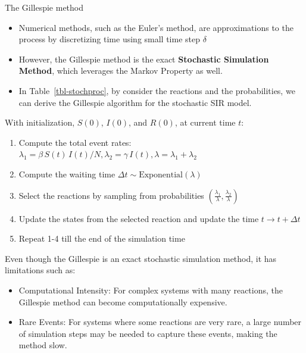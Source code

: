 \documentclass[
  ignorenonframetext,
  aspectratio=169,
  t]{beamer}
\theoremstyle{definition}
\begin{document}
\begin{frame}[allowframebreaks]{The Gillespie method}
\label{the-gillespie-method}
\begin{itemize}
\item
  Numerical methods, such as the Euler's method, are approximations to
  the process by discretizing time using small time step \(\delta\)
\item
  However, the Gillespie method is the exact \textbf{Stochastic
  Simulation Method}, which leverages the Markov Property as well.
\item
  In Table~\ref{tbl-stochproc}, by consider the reactions and the
  probabilities, we can derive the Gillespie algorithm for the
  stochastic SIR model.
\end{itemize}

\framebreak

With initialization, \(S(0)\), \(I(0)\), and \(R(0)\), at current time
\(t\):

\begin{enumerate}
\item
  Compute the total event rates:
  \(\lambda_1 = \beta\,S(t)\,I(t)/N, \lambda_2 = \gamma\,I(t), \lambda = \lambda_1 + \lambda_2\)
\item
  Compute the waiting time
  \(\Delta t \sim \mathrm{Exponential}(\lambda)\)
\item
  Select the reactions by sampling from probabilities
  \(\left(\frac{\lambda_1}{\lambda}, \frac{\lambda_2}{\lambda}\right)\)
\item
  Update the states from the selected reaction and update the time
  \(t\to t+\Delta t\)
\item
  Repeat 1-4 till the end of the simulation time
\end{enumerate}

\vfill

Even though the Gillespie is an exact stochastic simulation method, it
has limitations such as:

\begin{itemize}
\item
  Computational Intensity: For complex systems with many reactions, the
  Gillespie method can become computationally expensive.
\item
  Rare Events: For systems where some reactions are very rare, a large
  number of simulation steps may be needed to capture these events,
  making the method slow.
\end{itemize}
\end{frame}
\end{document}
